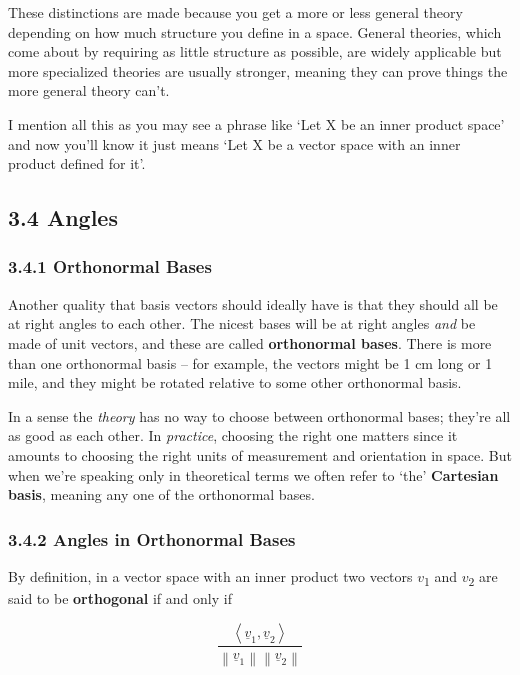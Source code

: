 \documentclass[oneside,english]{amsbook}
\numberwithin{section}{chapter}
\theoremstyle{plain}
\theoremstyle{definition}
\begin{document}
These distinctions are made because you get a more or less general
theory depending on how much structure you define in a space. General
theories, which come about by requiring as little structure as possible,
are widely applicable but more specialized theories are usually
stronger, meaning they can prove things the more general theory can't.

I mention all this as you may see a phrase like `Let X be an inner
product space' and now you'll know it just means `Let X be a vector
space with an inner product defined for it'.

\subsection{3.4 Angles}\label{angles}

\subsubsection{3.4.1 Orthonormal Bases}\label{orthonormal-bases}

Another quality that basis vectors should ideally have is that they
should all be at right angles to each other. The nicest bases will be at
right angles \emph{and} be made of unit vectors, and these are called
\textbf{orthonormal bases}. There is more than one orthonormal basis --
for example, the vectors might be 1 cm long or 1 mile, and they might be
rotated relative to some other orthonormal basis.

In a sense the \emph{theory} has no way to choose between orthonormal
bases; they're all as good as each other. In \emph{practice}, choosing
the right one matters since it amounts to choosing the right units of
measurement and orientation in space. But when we're speaking only in
theoretical terms we often refer to `the' \textbf{Cartesian basis},
meaning any one of the orthonormal bases.

\subsubsection{3.4.2 Angles in Orthonormal
	Bases}\label{angles-in-orthonormal-bases}

By definition, in a vector space with an inner product two vectors
$v$\textsubscript{1} and $v$\textsubscript{2} are said to be
\textbf{orthogonal} if and only if

\[\frac{\left\langle {\underline{v}}_{1},{\underline{v}}_{2} \right\rangle}{\left\| {\underline{v}}_{1} \right\|\left\| {\underline{v}}_{2} \right\|}\]
\end{document}
